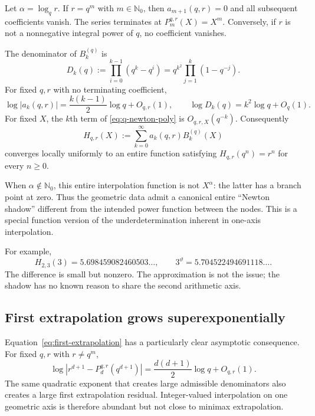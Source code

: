 \documentclass[11pt,oneside]{article}
\theoremstyle{definition}
\theoremstyle{remark}
\newcommand{\Nzero}{\mathbb N_0}
\newcommand{\thetaq}{\vartheta}
\begin{document}
Let $\alpha=\log_qr$.  If $r=q^m$ with $m\in\Nzero$, then
$a_{m+1}(q,r)=0$ and all subsequent coefficients vanish.  The series terminates at
$P_m^{q,r}(X)=X^m$.  Conversely, if $r$ is not a nonnegative integral power of $q$, no
coefficient vanishes.

The denominator of $B_k^{(q)}$ is
\begin{equation}
 D_k(q):=\prod_{i=0}^{k-1}(q^k-q^i)
 =q^{k^2}\prod_{j=1}^k(1-q^{-j}).
 \label{eq:q-newton-denominator}
\end{equation}
For fixed $q,r$ with no terminating coefficient,
\begin{equation}
 \log|a_k(q,r)|=\frac{k(k-1)}2\log q+O_{q,r}(1),
 \qquad
 \log D_k(q)=k^2\log q+O_q(1).
 \label{eq:q-newton-growth}
\end{equation}
For fixed $X$, the $k$th term of \eqref{eq:q-newton-poly} is $O_{q,r,X}(q^{-k})$.
Consequently
\begin{equation}
 H_{q,r}(X):=\sum_{k=0}^\infty a_k(q,r)B_k^{(q)}(X)
 \label{eq:newton-shadow}
\end{equation}
converges locally uniformly to an entire function satisfying
$H_{q,r}(q^n)=r^n$ for every $n\ge0$.

When $\alpha\notin\Nzero$, this entire interpolation function is not $X^\alpha$: the latter
has a branch point at zero.  Thus the geometric data admit a canonical entire ``Newton
shadow'' different from the intended power function between the nodes.  This is a special
function version of the underdetermination inherent in one-axis interpolation.

For example,
\[
 H_{2,3}(3)=5.698459082460503\ldots,
 \qquad
 3^{\thetaq}=5.704522494691118\ldots.
\]
The difference is small but nonzero.  The approximation is not the issue; the shadow has no
known reason to share the second arithmetic axis.

\subsection{First extrapolation grows superexponentially}

Equation~\eqref{eq:first-extrapolation} has a particularly clear asymptotic consequence.
For fixed $q,r$ with $r\ne q^m$,
\begin{equation}
 \log\left|r^{d+1}-P_d^{q,r}(q^{d+1})\right|
 =\frac{d(d+1)}2\log q+O_{q,r}(1).
 \label{eq:extrapolation-growth}
\end{equation}
The same quadratic exponent that creates large admissible denominators also creates a large
first extrapolation residual.  Integer-valued interpolation on one geometric axis is
therefore abundant but not close to minimax extrapolation.
\end{document}
